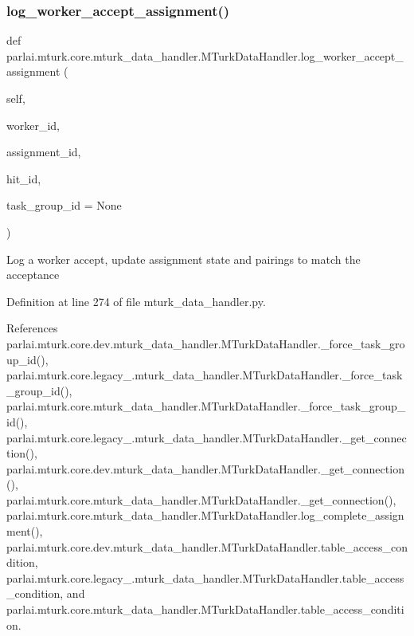 \subsubsection{\texorpdfstring{log\+\_\+worker\+\_\+accept\+\_\+assignment()}{log\_worker\_accept\_assignment()}}
{\footnotesize\ttfamily def parlai.\+mturk.\+core.\+mturk\+\_\+data\+\_\+handler.\+M\+Turk\+Data\+Handler.\+log\+\_\+worker\+\_\+accept\+\_\+assignment (\begin{DoxyParamCaption}\item[{}]{self,  }\item[{}]{worker\+\_\+id,  }\item[{}]{assignment\+\_\+id,  }\item[{}]{hit\+\_\+id,  }\item[{}]{task\+\_\+group\+\_\+id = {\ttfamily None} }\end{DoxyParamCaption})}

\begin{DoxyVerb}Log a worker accept, update assignment state and pairings to match
the acceptance
\end{DoxyVerb}
 

Definition at line 274 of file mturk\+\_\+data\+\_\+handler.\+py.



References parlai.\+mturk.\+core.\+dev.\+mturk\+\_\+data\+\_\+handler.\+M\+Turk\+Data\+Handler.\+\_\+force\+\_\+task\+\_\+group\+\_\+id(), parlai.\+mturk.\+core.\+legacy\+\_.\+mturk\+\_\+data\+\_\+handler.\+M\+Turk\+Data\+Handler.\+\_\+force\+\_\+task\+\_\+group\+\_\+id(), parlai.\+mturk.\+core.\+mturk\+\_\+data\+\_\+handler.\+M\+Turk\+Data\+Handler.\+\_\+force\+\_\+task\+\_\+group\+\_\+id(), parlai.\+mturk.\+core.\+legacy\+\_.\+mturk\+\_\+data\+\_\+handler.\+M\+Turk\+Data\+Handler.\+\_\+get\+\_\+connection(), parlai.\+mturk.\+core.\+dev.\+mturk\+\_\+data\+\_\+handler.\+M\+Turk\+Data\+Handler.\+\_\+get\+\_\+connection(), parlai.\+mturk.\+core.\+mturk\+\_\+data\+\_\+handler.\+M\+Turk\+Data\+Handler.\+\_\+get\+\_\+connection(), parlai.\+mturk.\+core.\+mturk\+\_\+data\+\_\+handler.\+M\+Turk\+Data\+Handler.\+log\+\_\+complete\+\_\+assignment(), parlai.\+mturk.\+core.\+dev.\+mturk\+\_\+data\+\_\+handler.\+M\+Turk\+Data\+Handler.\+table\+\_\+access\+\_\+condition, parlai.\+mturk.\+core.\+legacy\+\_.\+mturk\+\_\+data\+\_\+handler.\+M\+Turk\+Data\+Handler.\+table\+\_\+access\+\_\+condition, and parlai.\+mturk.\+core.\+mturk\+\_\+data\+\_\+handler.\+M\+Turk\+Data\+Handler.\+table\+\_\+access\+\_\+condition.



